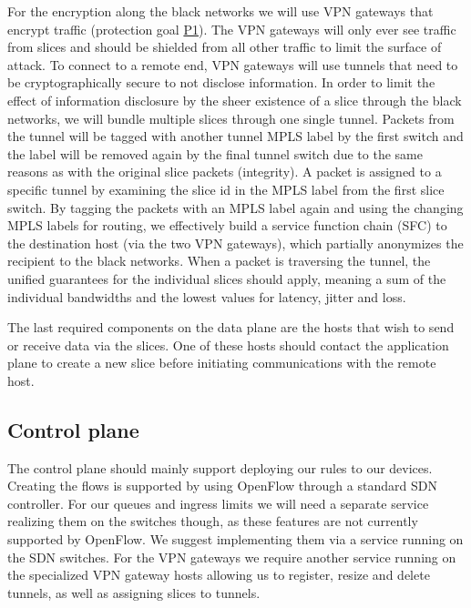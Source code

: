 For the encryption along the black networks we will use VPN gateways that encrypt traffic (protection goal \hyperref[P1]{P1}). The VPN gateways will only ever see traffic from slices and should be shielded from all other traffic to limit the surface of attack. To connect to a remote end, VPN gateways will use tunnels that need to be cryptographically secure to not disclose information. In order to limit the effect of information disclosure by the sheer existence of a slice through the black networks, we will bundle multiple slices through one single tunnel. Packets from the tunnel will be tagged with another tunnel MPLS label by the first switch and the label will be removed again by the final tunnel switch due to the same reasons as with the original slice packets (integrity). A packet is assigned to a specific tunnel by examining the slice id in the MPLS label from the first slice switch. By tagging the packets with an MPLS label again and using the changing MPLS labels for routing, we effectively build a service function chain (SFC) to the destination host (via the two VPN gateways), which partially anonymizes the recipient to the black networks. When a packet is traversing the tunnel, the unified guarantees for the individual slices should apply, meaning a sum of the individual bandwidths and the lowest values for latency, jitter and loss.

The last required components on the data plane are the hosts that wish to send or receive data via the slices. One of these hosts should contact the application plane to create a new slice before initiating communications with the remote host.


\subsection{Control plane}
The control plane should mainly support deploying our rules to our devices. Creating the flows is supported by using OpenFlow through a standard SDN controller. For our queues and ingress limits we will need a separate service realizing them on the switches though, as these features are not currently supported by OpenFlow. We suggest implementing them via a service running on the SDN switches. For the VPN gateways we require another service running on the specialized VPN gateway hosts allowing us to register, resize and delete tunnels, as well as assigning slices to tunnels.


